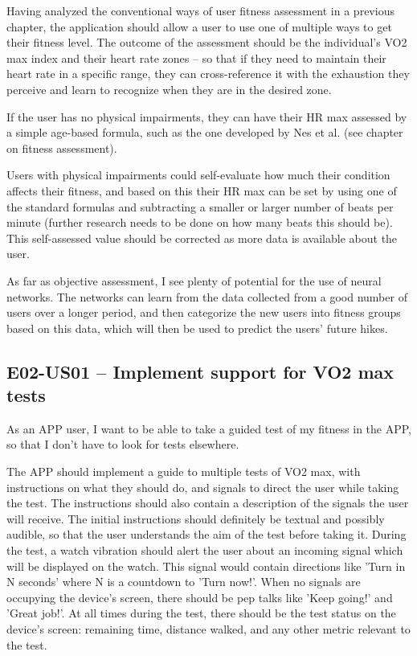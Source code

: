Having analyzed the conventional ways of user fitness assessment in a previous chapter, the application should allow a user to use one of multiple ways to get their fitness level.
The outcome of the assessment should be the individual's VO2 max index and their heart rate zones -- so that if they need to maintain their heart rate in a specific range, they can cross-reference it with the exhaustion they perceive and learn to recognize when they are in the desired zone.

If the user has no physical impairments, they can have their HR max assessed by a simple age-based formula, such as the one developed by Nes et al. (see chapter on fitness assessment).

Users with physical impairments could self-evaluate how much their condition affects their fitness, and based on this their HR max can be set by using one of the standard formulas and subtracting a smaller or larger number of beats per minute (further research needs to be done on how many beats this should be).
This self-assessed value should be corrected as more data is available about the user.

As far as objective assessment, I see plenty of potential for the use of neural networks.
The networks can learn from the data collected from a good number of users over a longer period, and then categorize the new users into fitness groups based on this data, which will then be used to predict the users' future hikes.

\subsection*{E02-US01 -- Implement support for VO2 max tests}
As an APP user, I want to be able to take a guided test of my fitness in the APP, so that I don't have to look for tests elsewhere.

The APP should implement a guide to multiple tests of VO2 max, with instructions on what they should do, and signals to direct the user while taking the test.
The instructions should also contain a description of the signals the user will receive.
The initial instructions should definitely be textual and possibly audible, so that the user understands the aim of the test before taking it.
During the test, a watch vibration should alert the user about an incoming signal which will be displayed on the watch.
This signal would contain directions like 'Turn in N seconds' where N is a countdown to 'Turn now!'.
When no signals are occupying the device's screen, there should be pep talks like 'Keep going!' and 'Great job!'.
At all times during the test, there should be the test status on the device's screen: remaining time, distance walked, and any other metric relevant to the test.

